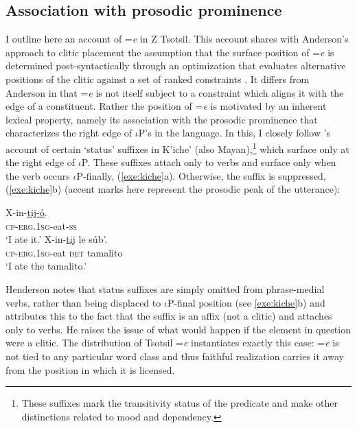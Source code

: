 \documentclass[output=paper,
modfonts
]{LSP/langsci}
\begin{document}
\subsection{Association with prosodic prominence}
I outline here an account of  =\emph{e} in Z Tsotsil. This account shares with Anderson's \citeyear{anderson2005} approach to clitic placement the assumption that the surface position
 of =\emph{e} is determined post-syntactically through an optimization that evaluates alternative positions of the clitic against a set of ranked constraints  \citep{prince1993}. 
  It differs from Anderson in that  =\emph{e} is not itself subject to a constraint which aligns it with the edge of a constituent. Rather the position of =\emph{e} is motivated by an 
inherent lexical property, namely its association with the prosodic prominence that characterizes the right edge of $\iota$P's in the language.
 In this, I closely follow  \cite{henderson2012ais}'s account of certain `status' suffixes in K'iche' (also Mayan),\footnote 
{These suffixes mark the transitivity status of the predicate and make other distinctions related to mood and dependency.} 
which surface only at the right edge of $\iota$P. These suffixes attach only to verbs
and surface only when the verb occurs $\iota$P-finally, (\ref{exe:kiche}a). Otherwise, the suffix is suppressed, (\ref{exe:kiche}b)  (accent marks here represent the prosodic
peak of the utterance):
\begin{exe}
\ex
\begin{xlist}
\gll X-in-\underline{tij-\'o}. \\
\textsc{cp-erg.1sg}-eat-\textsc{ss} \\
\glt `I ate it.'
\gll X-in-\underline{tij} le s\'ub'. \\
\textsc{cp-erg.1sg}-eat \textsc{det} tamalito \\
\glt `I ate the tamalito.' \citep[775--776]{henderson2012ais}
\end{xlist}
\label{exe:kiche}
\end{exe}
Henderson notes that status suffixes are simply omitted from phrase-medial verbs, rather than being displaced to $\iota$P-final position
(see \ref{exe:kiche}b) and attributes this to the fact that the suffix is an affix (not a clitic) and attaches only to verbs.
 He raises the issue of what would happen if the element in question were a clitic. 
The distribution of Tsotsil =\emph{e} instantiates exactly this case: =\emph{e} is not tied to any particular
word class and thus faithful realization carries it away from the position in which it is licensed.
\end{document}
